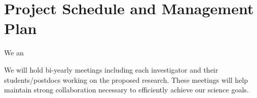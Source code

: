 \section{Project Schedule and Management Plan}

We an

We will  hold bi-yearly meetings including each investigator and their students/postdocs working on the proposed research. These meetings will help maintain strong collaboration necessary to efficiently achieve our science goals.
